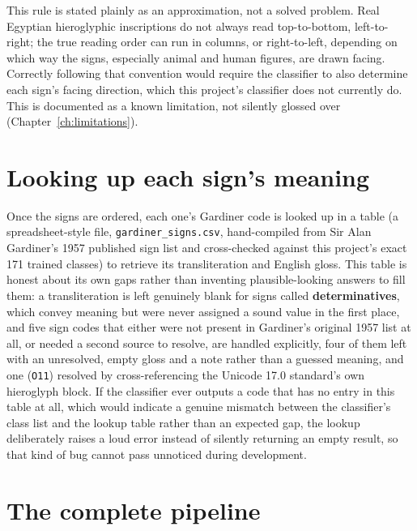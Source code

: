\documentclass[11pt,a4paper]{report}
\begin{document}
This rule is stated plainly as an approximation, not a solved problem. Real
Egyptian hieroglyphic inscriptions do not always read top-to-bottom,
left-to-right; the true reading order can run in columns, or right-to-left,
depending on which way the signs, especially animal and human figures, are
drawn facing. Correctly following that convention would require the
classifier to also determine each sign's facing direction, which this
project's classifier does not currently do. This is documented as a known
limitation, not silently glossed over (Chapter~\ref{ch:limitations}).

\section{Looking up each sign's meaning}
\label{sec:lookup}

Once the signs are ordered, each one's Gardiner code is looked up in a
table (a spreadsheet-style file, \texttt{gardiner\_signs.csv}, hand-compiled
from Sir Alan Gardiner's 1957 published sign list and cross-checked against
this project's exact 171 trained classes) to retrieve its transliteration
and English gloss. This table is honest about its own gaps rather than
inventing plausible-looking answers to fill them: a transliteration is left
genuinely blank for signs called \textbf{determinatives}, which convey
meaning but were never assigned a sound value in the first place, and five
sign codes that either were not present in Gardiner's original 1957 list at
all, or needed a second source to resolve, are handled explicitly, four of
them left with an unresolved, empty gloss and a note rather than a guessed
meaning, and one (\texttt{O11}) resolved by cross-referencing the Unicode
17.0 standard's own hieroglyph block. If the classifier ever outputs a code
that has no entry in this table at all, which would indicate a genuine
mismatch between the classifier's class list and the lookup table rather
than an expected gap, the lookup deliberately raises a loud error instead
of silently returning an empty result, so that kind of bug cannot pass
unnoticed during development.

\section{The complete pipeline}
\end{document}
